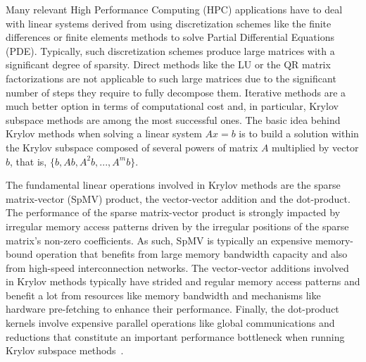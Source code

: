 Many relevant High Performance Computing (HPC) applications have to deal with linear systems derived from using discretization schemes like the finite differences or finite elements methods to solve Partial Differential Equations (PDE).
Typically, such discretization schemes produce large matrices with a significant degree of sparsity.
Direct methods like the LU or the QR matrix factorizations are not applicable to such large matrices due to the significant number of steps
they require to fully decompose them.
Iterative methods are a much better option in terms of computational cost and, in particular, Krylov subspace methods are among the most successful ones.
The basic idea behind Krylov methods when solving a linear system $Ax=b$ is to build a solution within the Krylov subspace composed of several powers of matrix $A$ multiplied by vector $b$, that is, $\{b, Ab, A^2b, ..., A^mb\}$. 

The fundamental linear operations involved in Krylov methods are the sparse matrix-vector (SpMV) product, the vector-vector addition and the dot-product.
The performance of the sparse matrix-vector product is strongly impacted by irregular memory access patterns 
driven by the irregular positions of the sparse matrix's non-zero coefficients. 
As such, SpMV is typically an expensive memory-bound operation that benefits from large memory bandwidth capacity and also from high-speed interconnection networks. 
The vector-vector additions involved in Krylov methods typically have strided and regular memory access patterns and benefit a lot from resources like memory bandwidth and mechanisms like hardware pre-fetching to enhance their performance.
Finally, the dot-product kernels involve expensive parallel operations like global communications and reductions that constitute an important performance bottleneck when running Krylov subspace methods~\cite{doe}.

